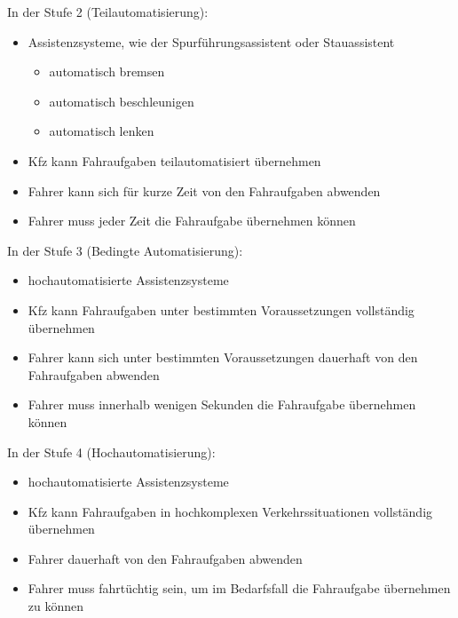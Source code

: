 \vspace{0.5cm}

In der Stufe 2 (Teilautomatisierung):
\begin{itemize}
	\item Assistenzsysteme, wie der Spurführungsassistent oder Stauassistent
	      \begin{itemize}
		      \item automatisch bremsen
		      \item automatisch beschleunigen
		      \item automatisch lenken
	      \end{itemize}
	\item \ac{Kfz} kann Fahraufgaben teilautomatisiert übernehmen
	\item Fahrer kann sich für kurze Zeit von den Fahraufgaben abwenden
	\item Fahrer muss jeder Zeit die Fahraufgabe übernehmen können
\end{itemize}

\vspace{0.5cm}

In der Stufe 3 (Bedingte Automatisierung):
\begin{itemize}
	\item hochautomatisierte Assistenzsysteme
	\item \ac{Kfz} kann Fahraufgaben unter bestimmten Voraussetzungen vollständig übernehmen
	\item Fahrer kann sich unter bestimmten Voraussetzungen dauerhaft von den Fahraufgaben abwenden
	\item Fahrer muss innerhalb wenigen Sekunden die Fahraufgabe übernehmen können
\end{itemize}

\vspace{0.5cm}

In der Stufe 4 (Hochautomatisierung):
\begin{itemize}
	\item hochautomatisierte Assistenzsysteme
	\item \ac{Kfz} kann Fahraufgaben in hochkomplexen Verkehrssituationen vollständig übernehmen
	\item Fahrer dauerhaft von den Fahraufgaben abwenden
	\item Fahrer muss fahrtüchtig sein, um im Bedarfsfall die Fahraufgabe übernehmen zu können
\end{itemize}

\vspace{0.5cm}

